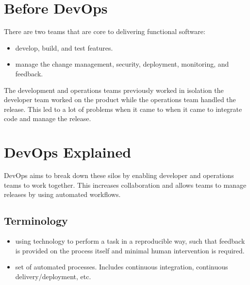 \documentclass[letterpaper,10pt,english]{jupyterBook}
\begin{document}
\section{Before DevOps}
\label{\detokenize{chapter_11/devops:before-devops}}
\sphinxAtStartPar
There are two teams that are core to delivering functional software:
\begin{itemize}
\item {} 
\sphinxAtStartPar
{} develop, build, and test features.

\item {} 
\sphinxAtStartPar
{} manage the change management, security,
deployment, monitoring, and feedback.

\end{itemize}

\sphinxAtStartPar
The development and operations teams previously worked in isolation \sphinxhyphen{}
the developer team worked on the product while the operations team
handled the release. This led to a lot of problems when it came to when
it came to integrate code and manage the release.

\sphinxAtStartPar
{}

\sphinxAtStartPar
{}


\section{DevOps Explained}
\label{\detokenize{chapter_11/devops:devops-explained}}
\sphinxAtStartPar
DevOps aims to break down these silos by enabling developer and
operations teams to work together. This increases collaboration and
allows teams to manage releases by using automated workflows.


\subsection{Terminology}
\label{\detokenize{chapter_11/devops:terminology}}\begin{itemize}
\item {} 
\sphinxAtStartPar
{} using technology to perform a task in a reproducible
way, such that feedback is provided on the process itself and
minimal human intervention is required.

\item {} 
\sphinxAtStartPar
{} set of automated processes. Includes continuous
integration, continuous delivery/deployment, etc.

\end{itemize}
\end{document}
